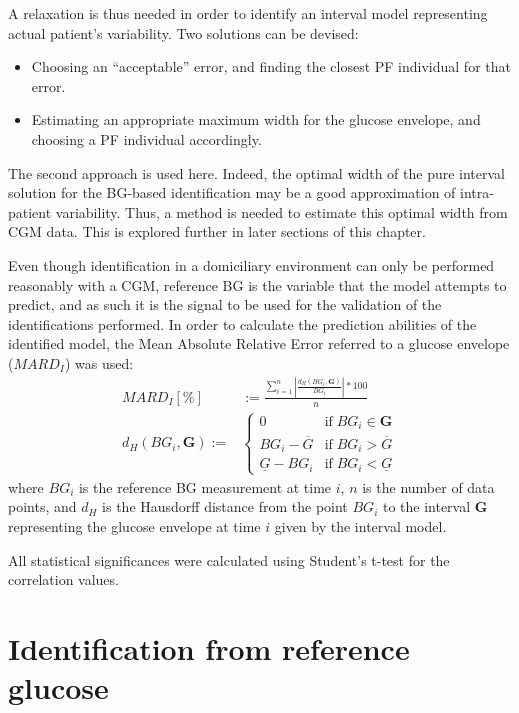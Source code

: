 A relaxation is thus needed in order to identify an interval model representing actual patient's variability. Two solutions can be devised: 
\begin{itemize}
	\item Choosing an ``acceptable'' error, and finding the closest PF individual for that error.
	\item Estimating an appropriate maximum width for the glucose envelope, and choosing a PF individual accordingly.
\end{itemize}

The second approach is used here. Indeed, the optimal width of the pure interval solution for the BG-based identification may be a good approximation of intra-patient variability. Thus, a method is needed to estimate this optimal width from CGM data. This is explored further in later sections of this chapter.

Even though identification in a domiciliary environment can only be performed reasonably with a CGM, reference BG is the variable that the model attempts to predict, and as such it is the signal to be used for the validation of the identifications performed. In order to calculate the prediction abilities of the identified model, the Mean Absolute Relative Error referred to a glucose envelope ($MARD_I$) was used:
\begin{align}
	MARD_I[\%] &:= \frac{\sum\limits_{i=1}^n\left|\frac{d_H\left(BG_i, \boldsymbol{G}\right)}{BG_i}\right|\ast 100}{n} \label{eq:mardi} \\
	d_H\left(BG_i, \boldsymbol{G}\right) := &
	\begin{cases}
	0 & \text{if} \; BG_i \in \boldsymbol{G} \\
	BG_i - \overline{G} & \text{if} \; BG_i > \overline{G} \\
  \underline{G} - BG_i & \text{if} \; BG_i < \underline{G}
	\end{cases}	
\end{align}
where $BG_i$ is the reference BG measurement at time $i$, $n$ is the number of data points, and $d_H$ is the Hausdorff distance from the point $BG_i$ to the interval $\boldsymbol{G}$ representing the glucose envelope at time $i$ given by the interval model.  

All statistical significances were calculated using Student's t-test for the correlation values.
	
\section{Identification from reference glucose}
\label{sec:IdentificationFromReferenceGlucose}

